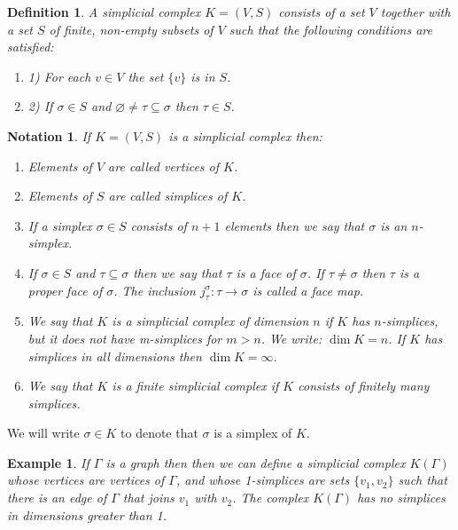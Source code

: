 \documentclass[11pt, letterpaper, oneside]{report}
\theoremstyle{pplain}
\newtheorem{ITERMVALUE THM}[theorem]{Intermediate Value Theorem}
\newtheorem{HEINEBOREL THM}[theorem]{Heine-Borel Theorem}
\newtheorem{UMETR THM}[theorem]{Urysohn Metrization Theorem}
\newtheorem{UMETR2 THM}[theorem]{Urysohn Metrization Theorem (v.2)}
\theoremstyle{ddefinition}
\newtheorem{definition}[theorem]{Definition}
\newtheorem{example}[theorem]{Example}
\newtheorem{notation}[theorem]{Notation}
\theoremstyle{nnn}
\newtheorem{TDA NN}[theorem]{Topological Data Analysis. }
\theoremstyle{eexercise}
\newcommand{\benu}{\begin{enumerate}}
\newcommand{\eenu}{\end{enumerate}}
\begin{document}
\begin{definition}
\label{SIMPL COMPLEX DEF}
A \emph{simplicial complex} $K = (V, S)$ consists of a set $V$ together with a set 
$S$ of finite, non-empty subsets of $V$ such that the following conditions are satisfied:
\benu
\item[1)] For each $v\in V$ the set $\{v\}$  is in $S$. 
\item[2)] If $\sigma \in S$ and $\varnothing \neq \tau \subseteq \sigma$ then $\tau \in S$. 
\eenu
\end{definition}

\begin{notation}
If $K= (V, S)$ is a simplicial complex then:
\benu[leftmargin = *]
\item[\textbullet] Elements of $V$ are called \emph{vertices} of $K$.
\item[\textbullet] Elements of $S$ are called \emph{simplices} of $K$. 
\item[\textbullet] If  a simplex $\sigma\in S$ consists of $n+1$ elements then 
we say that $\sigma$ is  an \emph{$n$-simplex}. 
\item[\textbullet]  If  $\sigma\in S$  and $\tau\subseteq \sigma$ then we say that 
$\tau$ is a \emph{face} of $\sigma$. If $\tau \neq \sigma$ then $\tau$ is a \emph{proper face} of 
$\sigma$. The inclusion $j^{\sigma}_{\tau}\colon \tau \to \sigma$ is called 
a \emph{face map}.
\item[\textbullet] We say that $K$ is a simplicial complex of dimension $n$ if $K$ has $n$-simplices,
but it does not have m-simplices for $m>n$. We write: $\dim K = n$. If $K$ has simplices in all dimensions 
then $\dim K = \infty$. 
\item[\textbullet]  We say that $K$ is a finite simplicial complex if $K$ consists of finitely many simplices. 
\eenu
\end{notation}


We will write $\sigma \in K$ to denote that $\sigma$ is a simplex of $K$. 


\begin{example}
If $\Gamma$ is a  graph then 
then we can define a simplicial complex $K(\Gamma)$ whose vertices are vertices of $\Gamma$, 
and whose 1-simplices are  sets $\{v_{1}, v_{2}\}$ such that there is an edge  of $\Gamma$ that joins 
$v_{1}$ with $v_{2}$.  The complex $K(\Gamma)$ has no simplices in dimensions greater than 1. 
\end{example}
 
\end{document}
